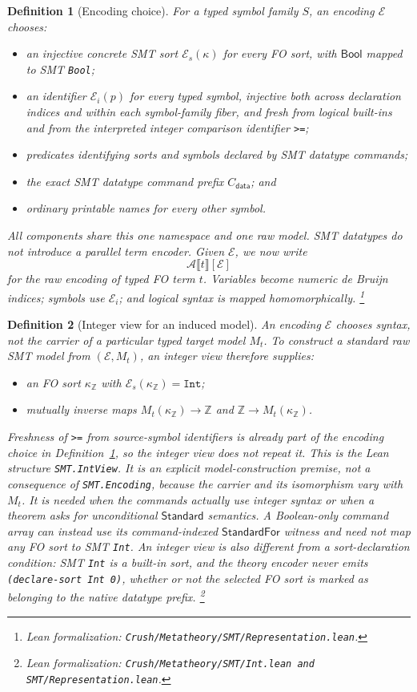 \documentclass[11pt]{article}
\newtheorem{definition}{Definition}[section]
\theoremstyle{remark}
\newcommand{\leanfile}[1]{\footnote{Lean formalization: \texttt{Crush/Metatheory/#1}.}}
\newcommand{\leanfiles}[1]{\footnote{Lean formalization: \texttt{Crush/Metatheory/#1}.}}
\newcommand{\Bool}{\mathsf{Bool}}
\newcommand{\smtenc}[2]{\mathcal A\llbracket #2\rrbracket[#1]}
\begin{document}
\begin{definition}[Encoding choice]\label{def:encoding-choice}
For a typed symbol family $S$, an encoding $\mathcal E$ chooses:
\begin{itemize}[leftmargin=*]
 \item an injective concrete SMT sort $\mathcal E_s(\kappa)$ for every FO sort,
       with $\Bool$ mapped to SMT \texttt{Bool};
 \item an identifier $\mathcal E_i(p)$ for every typed symbol, injective both
       across declaration indices and within each symbol-family fiber, and
       fresh from logical built-ins and from the interpreted integer comparison
       identifier \texttt{>=};
 \item predicates identifying sorts and symbols declared by SMT datatype commands;
 \item the exact SMT datatype command prefix $C_{\mathsf{data}}$; and
 \item ordinary printable names for every other symbol.
\end{itemize}
All components share this one namespace and one raw model. SMT datatypes do
not introduce a parallel term encoder. Given $\mathcal E$, we now write
\[
 \smtenc{\mathcal E}{t}
\]
for the raw encoding of typed FO term $t$. Variables become numeric de Bruijn
indices; symbols use $\mathcal E_i$; and logical syntax is mapped
homomorphically.
\leanfile{SMT/Representation.lean}
\end{definition}

\begin{definition}[Integer view for an induced model]\label{def:integer-view}
An encoding $\mathcal E$ chooses syntax, not the carrier of a particular typed
target model $M_t$. To construct a standard raw SMT model from
$(\mathcal E,M_t)$, an \emph{integer view} therefore supplies:
\begin{itemize}[leftmargin=*]
 \item an FO sort $\kappa_{\mathbb Z}$ with
       $\mathcal E_s(\kappa_{\mathbb Z})=\mathtt{Int}$;
 \item mutually inverse maps
       $M_t(\kappa_{\mathbb Z})\to\mathbb Z$ and
       $\mathbb Z\to M_t(\kappa_{\mathbb Z})$.
\end{itemize}
Freshness of \texttt{>=} from source-symbol identifiers is already part of
the encoding choice in Definition~\ref{def:encoding-choice}, so the integer
view does not repeat it.
This is the Lean structure \texttt{SMT.IntView}. It is an explicit
model-construction premise, not a consequence of \texttt{SMT.Encoding}, because
the carrier and its isomorphism vary with $M_t$. It is needed when the commands
actually use integer syntax or when a theorem asks for unconditional
$\mathsf{Standard}$ semantics. A Boolean-only command array can instead use its
command-indexed $\mathsf{StandardFor}$ witness and need not map any FO sort to
SMT \texttt{Int}. An integer view is also different from a sort-declaration
condition: SMT \texttt{Int} is a built-in sort, and the theory encoder never
emits \texttt{(declare-sort Int 0)}, whether or not the selected FO sort is
marked as belonging to the native datatype prefix.
\leanfiles{SMT/Int.lean and SMT/Representation.lean}
\end{definition}
\end{document}
